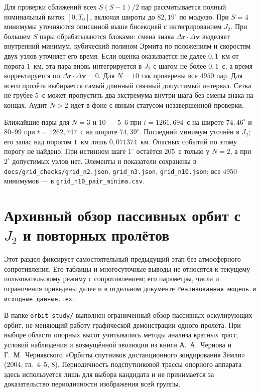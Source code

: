 \documentclass[a4paper,12pt]{article}
\begin{document}
Для проверки сближений всех $S(S-1)/2$ пар
рассчитывается полный номинальный виток
$[0,T_0]$, включая широты до $82{,}19^\circ$
по модулю. При $S=4$ минимумы уточняются
описанной выше бисекцией с интегрированием $J_2$.
При большем $S$ пары обрабатываются блоками:
смена знака $\Delta\mathbf r\cdot\Delta\mathbf v$
выделяет внутренний минимум, кубический полином
Эрмита по положениям и скоростям двух узлов
уточняет его время. Если оценка оказывается
не далее $0{,}1$~км от порога $1$~км,
эта пара вновь интегрируется в $J_2$ с шагом
не более $0{,}1$~с, а время корректируется
по $\Delta\mathbf r\cdot\Delta\mathbf v=0$.
Для $N=10$ так проверены все $4950$ пар.
Для всего пролёта выбирается самый длинный связный
допустимый интервал. Сетка не грубее $5$~с может пропустить
два экстремума внутри шага без смены знака
на концах. Аудит $N>2$ идёт в фоне с явным
статусом незавершённой проверки.

Ближайшие пары для $N=3$ и $10$ ---
$5$--$6$ при $t=1261{,}694$~с на широте
$74{,}46^\circ$ и $80$--$99$ при
$t=1262{,}747$~с на широте $74{,}39^\circ$.
Последний минимум уточнён в $J_2$; его запас
над порогом $1$~км лишь $0{,}071374$~км.
Опасных событий по этому порогу не найдено.
При истинном шаге $1^\circ$ остаётся $205$~с
только у $N=2$, а при $2^\circ$ допустимых
узлов нет. Элементы и показатели сохранены в
\texttt{docs/grid\_checks/grid\_n2.json},
\texttt{grid\_n3.json}, \texttt{grid\_n10.json};
все $4950$ минимумов --- в
\texttt{grid\_n10\_pair\_minima.csv}.

\section{Архивный обзор пассивных орбит с $J_2$ и повторных пролётов}

Этот раздел фиксирует самостоятельный предыдущий этап без атмосферного
сопротивления. Его таблицы и многосуточные выводы не относятся к
текущему пользовательскому режиму с сопротивлением; его параметры,
числа и ограничения приведены далее и в отдельном документе
\texttt{Реализованная модель и исходные данные.tex}.

В папке \texttt{orbit\_study/} выполнен ограниченный обзор
пассивных оскулирующих орбит, не меняющий работу графической
демонстрации одного пролёта. При выборе области опорных высот
учитывались методы анализа кратных трасс, условий наблюдения
и возмущённой эволюции из книги А.~А.~Чернова и
Г.~М.~Чернявского «Орбиты спутников дистанционного зондирования
Земли» (2004, гл.~4--5, 8). Периодичность подспутниковой
трассы опорного аппарата здесь используется лишь для выбора
кандидата и не принимается за доказательство периодичности
изображения всей группы.
\end{document}
